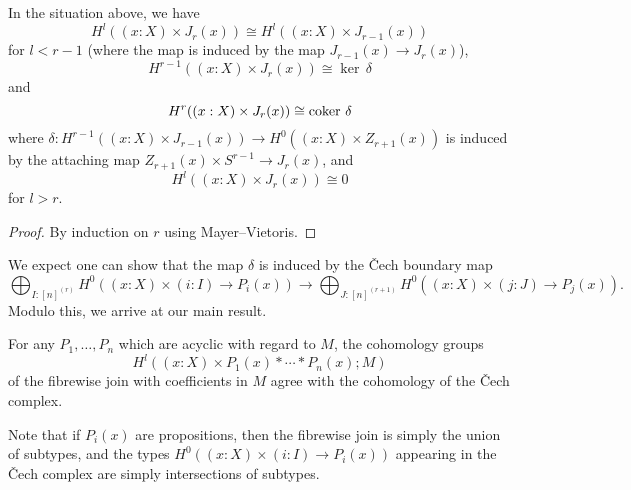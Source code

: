 \begin{lemma}
In the situation above, we have
\[H^l((x : X) \times J_r(x)) \cong H^l((x : X) \times J_{r-1}(x))\]
for $l < r-1$ (where the map is induced by the map $J_{r-1}(x) \to J_r(x)$),
	\[H^{r-1}((x : X) \times J_r(x)) \cong \ker\,\delta\]
	and
	\[H^r((x : X) \times J_r(x)) \cong \operatorname{coker}\,\delta\]
	where $\delta : H^{r-1}((x : X) \times J_{r-1}(x)) \to H^0((x : X) \times Z_{r+1}(x))$
	is induced by the attaching map $Z_{r+1}(x) \times S^{r-1} \to J_r(x)$,
	and
\[H^l((x : X) \times J_r(x)) \cong 0\]
for $l > r$.
\end{lemma}
\begin{proof}
By induction on $r$ using Mayer--Vietoris.
\end{proof}
We expect one can show that the map $\delta$ is induced by the \v{C}ech boundary map
\[ \bigoplus_{I : [n]^{(r)}} H^0((x : X) \times (i : I) \to P_i(x))
	\to
	\bigoplus_{J : [n]^{(r+1)}} H^0((x : X) \times (j : J) \to P_j(x)). \]
Modulo this, we arrive at our main result.
\begin{theorem}
For any $P_1,\ldots,P_n$ which are acyclic with regard to $M$, the cohomology groups 
\[
H^l((x: X) \times P_1(x) * \cdots * P_n(x); M)
\]
of the fibrewise join with coefficients in $M$ agree with the cohomology of the \v{C}ech complex.
\end{theorem}
Note that if $P_i(x)$ are propositions, then the fibrewise join
is simply the union of subtypes, and the types 
$H^0((x : X) \times (i: I) \to P_i(x))$ appearing in the \v{C}ech complex
are simply intersections of subtypes.
